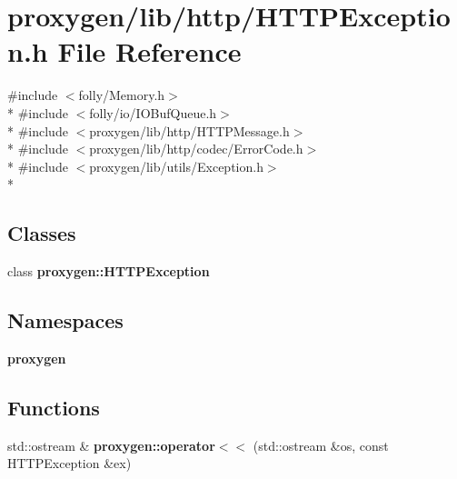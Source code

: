 \section{proxygen/lib/http/\+H\+T\+T\+P\+Exception.h File Reference}
\label{HTTPException_8h}
{\ttfamily \#include $<$folly/\+Memory.\+h$>$}\\*
{\ttfamily \#include $<$folly/io/\+I\+O\+Buf\+Queue.\+h$>$}\\*
{\ttfamily \#include $<$proxygen/lib/http/\+H\+T\+T\+P\+Message.\+h$>$}\\*
{\ttfamily \#include $<$proxygen/lib/http/codec/\+Error\+Code.\+h$>$}\\*
{\ttfamily \#include $<$proxygen/lib/utils/\+Exception.\+h$>$}\\*
\subsection*{Classes}
\begin{DoxyCompactItemize}
\item 
class {\bf proxygen\+::\+H\+T\+T\+P\+Exception}
\end{DoxyCompactItemize}
\subsection*{Namespaces}
\begin{DoxyCompactItemize}
\item 
 {\bf proxygen}
\end{DoxyCompactItemize}
\subsection*{Functions}
\begin{DoxyCompactItemize}
\item 
std\+::ostream \& {\bf proxygen\+::operator$<$$<$} (std\+::ostream \&os, const H\+T\+T\+P\+Exception \&ex)
\end{DoxyCompactItemize}
